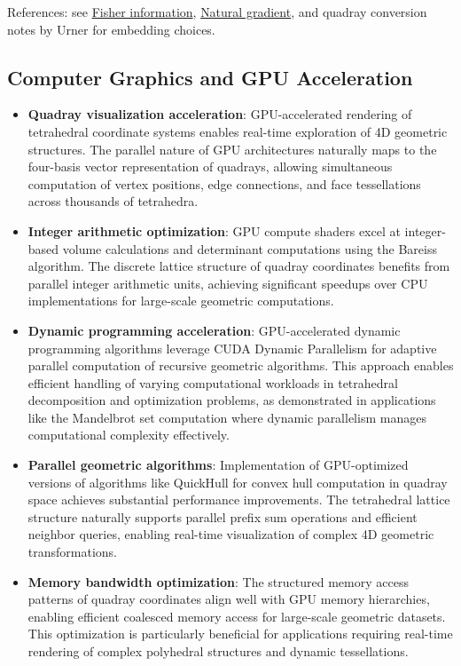 \documentclass[
  10pt,
]{article}
\providecommand{\tightlist}{%
  \setlength{\itemsep}{0pt}\setlength{\parskip}{0pt}}
\begin{document}
References: see
\href{https://en.wikipedia.org/wiki/Fisher_information}{Fisher
information},
\href{https://en.wikipedia.org/wiki/Natural_gradient}{Natural gradient},
and quadray conversion notes by Urner for embedding choices.

\hypertarget{computer-graphics-and-gpu-acceleration}{%
\subsection{Computer Graphics and GPU
Acceleration}\label{computer-graphics-and-gpu-acceleration}}

\begin{itemize}
\tightlist
\item
  \textbf{Quadray visualization acceleration}: GPU-accelerated rendering
  of tetrahedral coordinate systems enables real-time exploration of 4D
  geometric structures. The parallel nature of GPU architectures
  naturally maps to the four-basis vector representation of quadrays,
  allowing simultaneous computation of vertex positions, edge
  connections, and face tessellations across thousands of tetrahedra.
\item
  \textbf{Integer arithmetic optimization}: GPU compute shaders excel at
  integer-based volume calculations and determinant computations using
  the Bareiss algorithm. The discrete lattice structure of quadray
  coordinates benefits from parallel integer arithmetic units, achieving
  significant speedups over CPU implementations for large-scale
  geometric computations.
\item
  \textbf{Dynamic programming acceleration}: GPU-accelerated dynamic
  programming algorithms leverage CUDA Dynamic Parallelism for adaptive
  parallel computation of recursive geometric algorithms. This approach
  enables efficient handling of varying computational workloads in
  tetrahedral decomposition and optimization problems, as demonstrated
  in applications like the Mandelbrot set computation where dynamic
  parallelism manages computational complexity effectively.
\item
  \textbf{Parallel geometric algorithms}: Implementation of
  GPU-optimized versions of algorithms like QuickHull for convex hull
  computation in quadray space achieves substantial performance
  improvements. The tetrahedral lattice structure naturally supports
  parallel prefix sum operations and efficient neighbor queries,
  enabling real-time visualization of complex 4D geometric
  transformations.
\item
  \textbf{Memory bandwidth optimization}: The structured memory access
  patterns of quadray coordinates align well with GPU memory
  hierarchies, enabling efficient coalesced memory access for
  large-scale geometric datasets. This optimization is particularly
  beneficial for applications requiring real-time rendering of complex
  polyhedral structures and dynamic tessellations.
\end{itemize}
\end{document}
